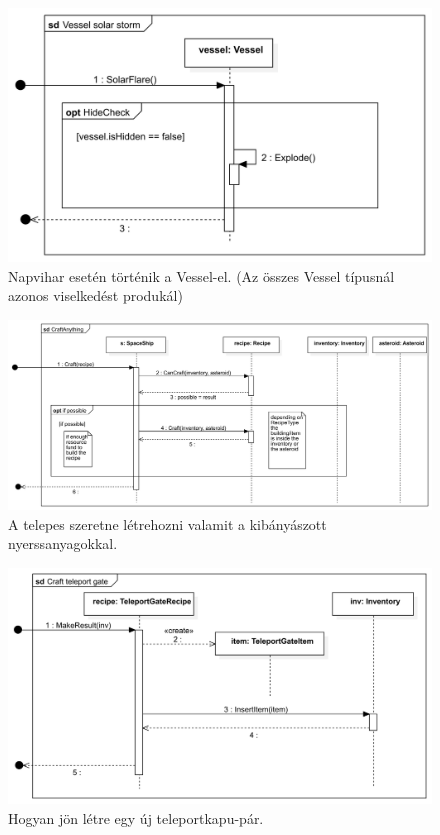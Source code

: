 \begin{figure}[H] 
\centering 
\includegraphics[width=1\textwidth]{docs/3_Project/svg/Design Model!Sun storm!Vessel solar storm!Vessel solar storm_17.png} 
\caption{Napvihar esetén történik a Vessel-el. (Az összes Vessel típusnál azonos viselkedést produkál)} 
\end{figure} 

\begin{figure}[H] 
\centering 
\includegraphics[width=1\textwidth]{docs/3_Project/svg/Design Model!Crafting!Craft!CraftAnything_18.png} 
\caption{A telepes szeretne létrehozni valamit a kibányászott nyerssanyagokkal.} 
\end{figure} 

\begin{figure}[H] 
\centering 
\includegraphics[width=1\textwidth]{docs/3_Project/svg/Design Model!Crafting!Craft teleport gate!Craft teleport gate_19.png} 
\caption{Hogyan jön létre egy új teleportkapu-pár.} 
\end{figure} 

